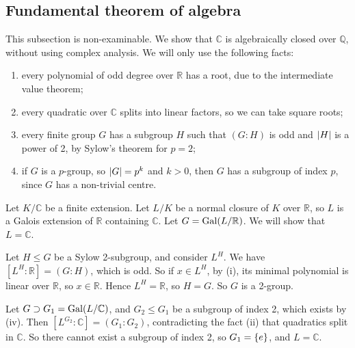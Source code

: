 \subsection{Fundamental theorem of algebra}
This subsection is non-examinable.
We show that \( \mathbb C \) is algebraically closed over \( \mathbb Q \), without using complex analysis.
We will only use the following facts:
\begin{enumerate}
	\item every polynomial of odd degree over \( \mathbb R \) has a root, due to the intermediate value theorem;
	\item every quadratic over \( \mathbb C \) splits into linear factors, so we can take square roots;
	\item every finite group \( G \) has a subgroup \( H \) such that \( (G:H) \) is odd and \( \abs{H} \) is a power of 2, by Sylow's theorem for \( p = 2 \);
	\item if \( G \) is a \( p \)-group, so \( \abs{G} = p^k \) and \( k > 0 \), then \( G \) has a subgroup of index \( p \), since \( G \) has a non-trivial centre.
\end{enumerate}
Let \( K / \mathbb C \) be a finite extension.
Let \( L / K \) be a normal closure of \( K \) over \( \mathbb R \), so \( L \) is a Galois extension of \( \mathbb R \) containing \( \mathbb C \).
Let \( G = \operatorname{Gal}(L/\mathbb R) \).
We will show that \( L = \mathbb C \).

Let \( H \leq G \) be a Sylow 2-subgroup, and consider \( L^H \).
We have \( [L^H:\mathbb R] = (G:H) \), which is odd.
So if \( x \in L^H \), by (i), its minimal polynomial is linear over \( \mathbb R \), so \( x \in \mathbb R \).
Hence \( L^H = \mathbb R \), so \( H = G \).
So \( G \) is a 2-group.

Let \( G \supset G_1 = \operatorname{Gal}(L/\mathbb C) \), and \( G_2 \leq G_1 \) be a subgroup of index 2, which exists by (iv).
Then \( [L^{G_2}:\mathbb C] = (G_1 : G_2) \), contradicting the fact (ii) that quadratics split in \( \mathbb C \).
So there cannot exist a subgroup of index 2, so \( G_1 = \qty{e} \), and \( L = \mathbb C \).

